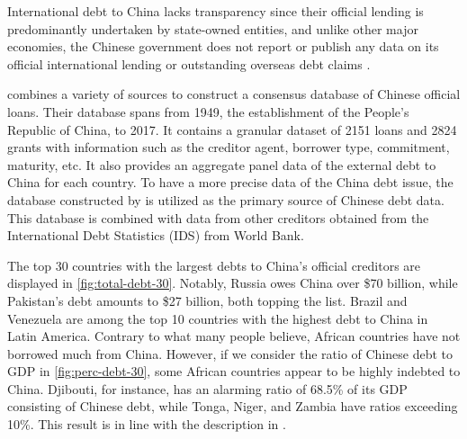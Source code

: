 International debt to China lacks transparency since their official lending is predominantly undertaken by state-owned entities, and unlike other major economies, the Chinese government does not report or publish any data on its official international lending or outstanding overseas debt claims \citep*{Horn-Reinhart-Trebesch-21}.


\citet*{Horn-Reinhart-Trebesch-21} combines a variety of sources to construct a consensus database of Chinese official loans.
Their database spans from 1949, the establishment of the People's Republic of China, to 2017. It contains a granular dataset of 2151 loans and 2824 grants with information such as the creditor agent, borrower type, commitment, maturity, etc. It also provides an aggregate panel data of the external debt to China for each country.
To have a more precise data of the China debt issue, the database constructed by \citet*{Horn-Reinhart-Trebesch-21} is utilized as the primary source of Chinese debt data. This database is combined with data from other creditors obtained from the International Debt Statistics (IDS) from World Bank.

The top 30 countries with the largest debts to China's official creditors are displayed in \autoref{fig:total-debt-30}. Notably, Russia owes China over \$70 billion, while Pakistan's debt amounts to \$27 billion, both topping the list. Brazil and Venezuela are among the top 10 countries with the highest debt to China in Latin America. Contrary to what many people believe, African countries have not borrowed much from China. However, if we consider the ratio of Chinese debt to GDP in \autoref{fig:perc-debt-30}, some African countries appear to be highly indebted to China. Djibouti, for instance, has an alarming ratio of 68.5\% of its GDP consisting of Chinese debt, while Tonga, Niger, and Zambia have ratios exceeding 10\%. This result is in line with the description in \citet{Eom-18}.

